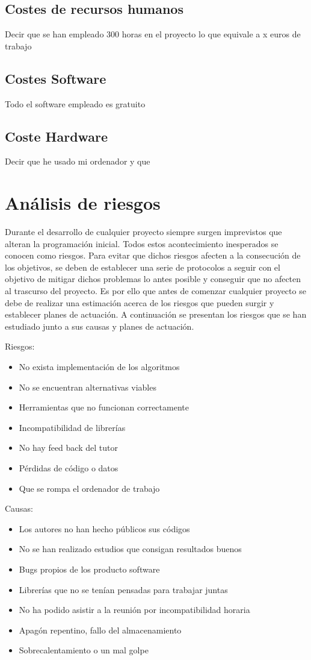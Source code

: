 \subsection{Costes de recursos humanos}
Decir que se han empleado 300 horas en el proyecto lo que equivale a x euros de trabajo
\subsection{Costes Software}
Todo el software empleado es gratuito
\subsection{Coste Hardware}
Decir que he usado mi ordenador y que 

\section{Análisis de riesgos}

Durante el desarrollo de cualquier proyecto siempre surgen imprevistos que alteran la programación inicial. Todos estos acontecimiento inesperados se conocen como riesgos. Para evitar que dichos riesgos afecten a la consecución de los objetivos, se deben de establecer una serie de protocolos a seguir con el objetivo de mitigar dichos problemas lo antes posible y conseguir que no afecten al trascurso del proyecto. Es por ello que antes de comenzar cualquier proyecto se debe de realizar una estimación acerca de los riesgos que pueden surgir y establecer planes de actuación. A continuación se presentan los riesgos que se han estudiado junto a sus causas y planes de actuación.




Riesgos:
\begin{itemize}
    \item No exista implementación de los algoritmos
    \item No se encuentran alternativas viables
    \item Herramientas que no funcionan correctamente
    \item Incompatibilidad de librerías
    \item No hay feed back del tutor
    \item Pérdidas de código o datos
    \item Que se rompa el ordenador de trabajo
\end{itemize}

Causas:
\begin{itemize}
    \item Los autores no han hecho públicos sus códigos
    \item No se han realizado estudios que consigan resultados buenos
    \item Bugs propios de los producto software
    \item Librerías que no se tenían pensadas para trabajar juntas
    \item No ha podido asistir a la reunión por incompatibilidad horaria
    \item Apagón repentino, fallo del almacenamiento
    \item Sobrecalentamiento o un mal golpe
\end{itemize}

